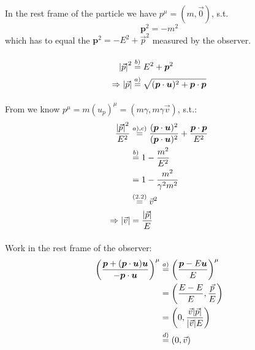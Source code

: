 \paragraph{\phantom{,}}
In the rest frame of the particle we have $p^\mu=(m,\vec{0})$, s.t.
\[\boldsymbol{p}^2=-m^2\]
which has to equal the $\boldsymbol{p}^2=-E^2+\vec{p}^2$ measured by the observer.
\paragraph{\phantom{,}}
\begin{align*} 
	\abs{\vec{p}}^2&\overset{b)}{=}E^2+\boldsymbol{p}^2\\
	\Rightarrow 	\abs{\vec{p}}&\overset{a)}{=}\sqrt{(\boldsymbol{p}\cdot\boldsymbol{u})^2 +\boldsymbol{p}\cdot\boldsymbol{p}}
\end{align*}
\paragraph{\phantom{,}}
From  we know $p^\mu=m \left(u_p\right)^\mu=(m\gamma,m\gamma\vec{v})$, s.t.:
\begin{align*} 
	\dfrac{\abs{\vec{p}}^2}{E^2}&\overset{a),c)}{=}\dfrac{(\boldsymbol{p}\cdot\boldsymbol{u})^2}{(\boldsymbol{p}\cdot\boldsymbol{u})^2}+\dfrac{\boldsymbol{p}\cdot\boldsymbol{p}}{E^2}\\
	&\overset{b)}{=}1-\dfrac{m^2}{E^2}\\
	&=1-\dfrac{m^2}{\gamma^2m^2}\\
	&\overset{({2.2})}{=}\vec{v}^2\\
	\Rightarrow \abs{\vec{v}}&=\dfrac{\abs{\vec{p}}}{E}
\end{align*}
\paragraph{\phantom{,}}
Work in the rest frame of the observer:
\begin{align*} 
	\left(\dfrac{\boldsymbol{p}+(\boldsymbol{p}\cdot\boldsymbol{u})\boldsymbol{u}}{-\boldsymbol{p}\cdot\boldsymbol{u}}\right)^\mu&\overset{a)}{=}\left(\dfrac{\boldsymbol{p}-E\boldsymbol{u}}{E}\right)^\mu\\
	&=\left(\dfrac{E-E}{E},\dfrac{\vec{p}}{E}\right)\\
	&=\left(0,\dfrac{\vec{v}\abs{\vec{p}}}{\abs{\vec{v}}E}\right)\\
	&\overset{d)}{=}\left(0,\vec{v}\right)
\end{align*}


